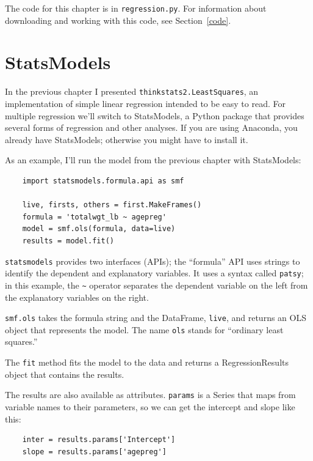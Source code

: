 \documentclass[12pt]{book}
\begin{document}
The code for this chapter is in \verb"regression.py".  For information
about downloading and working with this code, see Section~\ref{code}.

\section{StatsModels}
\label{statsmodels}

In the previous chapter I presented \verb"thinkstats2.LeastSquares", an
implementation of simple linear regression intended to be easy to
read.  For multiple regression we'll switch to StatsModels, a Python
package that provides several forms of regression and other
analyses.  If you are using Anaconda, you already have StatsModels;
otherwise you might have to install it.

As an example, I'll run the model from the previous chapter with
StatsModels:

\begin{verbatim}
    import statsmodels.formula.api as smf

    live, firsts, others = first.MakeFrames()
    formula = 'totalwgt_lb ~ agepreg'
    model = smf.ols(formula, data=live)
    results = model.fit()
\end{verbatim}

\verb"statsmodels" provides two interfaces (APIs); the ``formula''
API uses strings to identify the dependent and explanatory variables.
It uses a syntax called \verb"patsy"; in this example, the \verb"~"
operator separates the dependent variable on the left from the
explanatory variables on the right.

\verb"smf.ols" takes the formula string and the DataFrame, \verb"live",
and returns an OLS object that represents the model.  The name \verb"ols"
stands for ``ordinary least squares.''

The \verb"fit" method fits the model to the data and returns a
RegressionResults object that contains the results.

The results are also available as attributes.  \verb"params"
is a Series that maps from variable names to their parameters, so we can
get the intercept and slope like this:

\begin{verbatim}
    inter = results.params['Intercept']
    slope = results.params['agepreg']
\end{verbatim}
\end{document}
